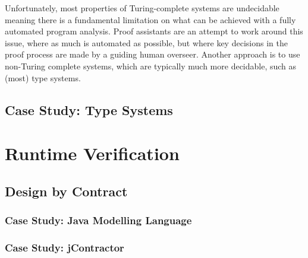 Unfortunately, most properties of Turing-complete systems are
undecidable\cite{turing}\cite{rice} meaning there is a fundamental
limitation on what can be achieved with a fully automated program
analysis. Proof assistants\cite{proofassists} are an attempt to work
around this issue, where as much is automated as possible, but where
key decisions in the proof process are made by a guiding human
overseer. Another approach is to use non-Turing complete systems,
which are typically much more decidable, such as (most) type systems.

\subsection{Case Study: Type Systems}
\label{sec:litrev-stat-types}


\section{Runtime Verification}
\label{sec:litrev-run}


\subsection{Design by Contract}
\label{sec:litrev-run-dbc}


\subsubsection{Case Study: Java Modelling Language}
\label{sec:litrev-run-dbc-jml}


\subsubsection{Case Study: jContractor}
\label{sec:litrev-run-dbc-jcon}


